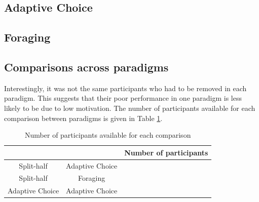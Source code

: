 \documentclass[a4paper, oneside, 11pt, onecolumn]{article}
\begin{document}
\subsection{Adaptive Choice}

\subsection{Foraging}

\subsection{Comparisons across paradigms}

Interestingly, it was not the same participants who had to be removed in each paradigm. This suggests that their poor performance in one paradigm is less likely to be due to low motivation. The number of participants available for each comparison between paradigms is given in Table \ref{tab:num_per_paradigm}.

\begin{table}
\centering
\small
\begin{tabular}{cc|c}
 		&				& Number of participants\\
 		\hline
Split-half & Adaptive Choice & \\
Split-half & Foraging & \\
Adaptive Choice & Adaptive Choice & \\


\end{tabular}

\caption{Number of participants available for each comparison}
\label{tab:num_per_paradigm}
\end{table}
\end{document}
